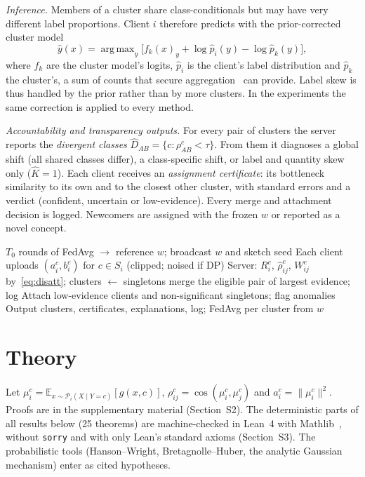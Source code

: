\documentclass[journal]{IEEEtran}
\theoremstyle{definition}
\newcommand{\E}{\mathbb{E}}
\newcommand{\cP}{\mathcal{P}}
\newcommand{\rhohat}{\hat\rho}
\DeclareMathOperator*{\argmax}{arg\,max}
\begin{document}
\emph{Inference.} Members of a cluster share class-conditionals but may have very different label proportions. Client $i$ therefore predicts with the prior-corrected cluster model
\begin{equation}\label{eq:pc}
\hat y(x)=\argmax_y\big[f_k(x)_y+\log\hat p_i(y)-\log\hat p_k(y)\big],
\end{equation}
where $f_k$ are the cluster model's logits, $\hat p_i$ is the client's label distribution and $\hat p_k$ the cluster's, a sum of counts that secure aggregation~\cite{bonawitz2017secagg} can provide. Label skew is thus handled by the prior rather than by more clusters. In the experiments the same correction is applied to every method.

\emph{Accountability and transparency outputs.} For every pair of clusters the server reports the \emph{divergent classes} $\hat D_{AB}=\{c:\rho^c_{AB}<\tau\}$. From them it diagnoses a global shift (all shared classes differ), a class-specific shift, or label and quantity skew only ($\hat K=1$). Each client receives an \emph{assignment certificate}: its bottleneck similarity to its own and to the closest other cluster, with standard errors and a verdict (confident, uncertain or low-evidence). Every merge and attachment decision is logged. Newcomers are assigned with the frozen $w$ or reported as a novel concept.

\begin{algorithm}[t]
\caption{DisCo-CFL}\label{alg:disco}
\small
\begin{algorithmic}[1]
\State $T_0$ rounds of FedAvg $\to$ reference $w$; broadcast $w$ and sketch seed
\State Each client uploads $(a_i^c,b_i^c)$ for $c\in S_i$ (clipped; noised if DP)
\State Server: $R_i^c$, $\rhohat^c_{ij}$, $W^c_{ij}$ by~\eqref{eq:disatt}; clusters $\gets$ singletons
 merge the eligible pair of largest evidence; log \EndWhile
\State Attach low-evidence clients and non-significant singletons; flag anomalies
\State Output clusters, certificates, explanations, log; FedAvg per cluster from $w$
\end{algorithmic}
\end{algorithm}

\section{Theory}\label{sec:theory}
Let $\mu_i^c=\E_{x\sim\cP_i(X\mid Y=c)}[g(x,c)]$, $\rho_{ij}^c=\cos(\mu_i^c,\mu_j^c)$ and $a_i^c=\|\mu_i^c\|^2$. Proofs are in the supplementary material (Section~S2). The deterministic parts of all results below (25 theorems) are machine-checked in Lean~4 with Mathlib~\cite{moura2021lean4,mathlib2020}, without \texttt{sorry} and with only Lean's standard axioms (Section~S3). The probabilistic tools (Hanson--Wright, Bretagnolle--Huber, the analytic Gaussian mechanism) enter as cited hypotheses.
\end{document}
